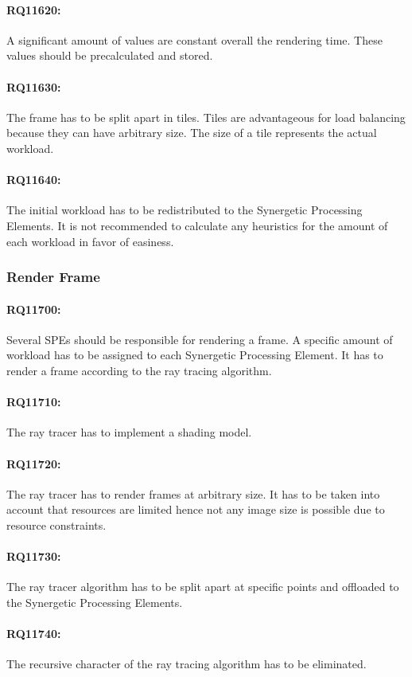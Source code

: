 \documentclass[DIV10, abstracton, openright, footsepline, headsepline, twoside, 9pt,
bigheadings]{scrreprt}
\begin{document}
\paragraph{RQ11620:} A significant
amount of values are constant overall the rendering time. These values should be
precalculated and stored.
\paragraph{RQ11630:} The frame has to be split apart in tiles.
Tiles are advantageous for load balancing because they can have arbitrary size.
The size of a tile represents the actual workload.
\paragraph{RQ11640:} The initial workload
has to be redistributed to the Synergetic Processing Elements. It is not
recommended to calculate any heuristics for the amount of each workload in favor
of easiness.

\subsubsection{Render Frame}
\paragraph{RQ11700:}  Several SPEs should be responsible for rendering a frame.
A specific amount of workload has to be assigned to each Synergetic Processing
Element. It has to render a frame according to the ray tracing algorithm.
\paragraph{RQ11710:} The ray tracer has to implement a
shading model.
\paragraph{RQ11720:} The ray tracer has to render frames at arbitrary size. It has
to be taken into account that resources are limited hence not any image size is
possible due to resource constraints.
\paragraph{RQ11730:} The ray tracer algorithm has to be split apart at specific
points and offloaded to the Synergetic Processing Elements.
\paragraph{RQ11740:} The recursive
character of the ray tracing algorithm has to be eliminated.
\end{document}
